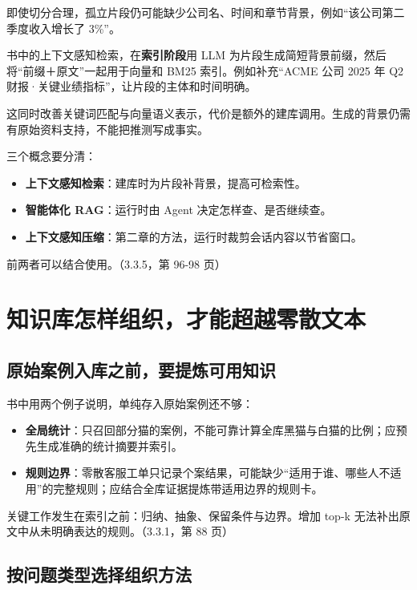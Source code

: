 \documentclass[UTF8,a4paper,11pt]{ctexart}
\newcommand{\code}[1]{{\small\ttfamily #1}}
\begin{document}
即使切分合理，孤立片段仍可能缺少公司名、时间和章节背景，例如“该公司第二季度收入增长了 3\%”。

书中的上下文感知检索，在\textbf{索引阶段}用 LLM 为片段生成简短背景前缀，然后将“前缀＋原文”一起用于向量和 BM25 索引。例如补充“ACME 公司 2025 年 Q2 财报·关键业绩指标”，让片段的主体和时间明确。

这同时改善关键词匹配与向量语义表示，代价是额外的建库调用。生成的背景仍需有原始资料支持，不能把推测写成事实。

三个概念要分清：

\begin{itemize}
\item \textbf{上下文感知检索}：建库时为片段补背景，提高可检索性。
\item \textbf{智能体化 RAG}：运行时由 Agent 决定怎样查、是否继续查。
\item \textbf{上下文感知压缩}：第二章的方法，运行时裁剪会话内容以节省窗口。
\end{itemize}

前两者可以结合使用。（3.3.5，第 96-98 页）

\section{知识库怎样组织，才能超越零散文本}

\subsection{原始案例入库之前，要提炼可用知识}

书中用两个例子说明，单纯存入原始案例还不够：

\begin{itemize}
\item \textbf{全局统计}：只召回部分猫的案例，不能可靠计算全库黑猫与白猫的比例；应预先生成准确的统计摘要并索引。
\item \textbf{规则边界}：零散客服工单只记录个案结果，可能缺少“适用于谁、哪些人不适用”的完整规则；应结合全库证据提炼带适用边界的规则卡。
\end{itemize}

关键工作发生在索引之前：归纳、抽象、保留条件与边界。增加 \code{top-\allowbreak k} 无法补出原文中从未明确表达的规则。（3.3.1，第 88 页）

\subsection{按问题类型选择组织方法}
\end{document}
